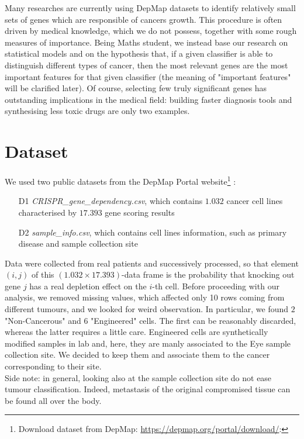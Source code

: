 \documentclass[a4paper,11pt, oneside]{article}  %
\begin{document}
	Many researches are currently using DepMap datasets to identify relatively small sets of genes which are responsible of cancers growth. This procedure is often driven by medical knowledge,  which we do not possess,  together with some rough measures of importance.  Being Maths student,  we instead base our research on statistical models and on the hypothesis that, if a given classifier is able to distinguish different types of cancer, then the most relevant genes are the most important features for that given classifier (the meaning of "important features" will be clarified later). Of course, selecting few truly significant genes has outstanding implications in the medical field: building faster diagnosis tools and synthesising less toxic drugs are only two examples. 
	
	
	\section{Dataset}
	We used two public datasets from the DepMap Portal website\footnote{Download dataset from DepMap:  \url{https://depmap.org/portal/download/}:} :
	\begin{itemize}
		\item[D1] \textit{CRISPR\_gene\_dependency.csv},  which contains $1.032$ cancer cell lines characterised by $17.393$ gene scoring results
		\item[D2] \textit{sample\_info.csv}, which contains cell lines information,  such as primary disease and sample collection site
	\end{itemize}
	Data were collected from real patients and successively processed,  so that element $(i, j)$ of this $(1.032 \times 17.393)$-data frame is the probability that knocking out gene $j$ has a real depletion effect on the $i$-th cell.
	Before proceeding with our analysis, we removed missing values, which affected only 10 rows coming from different tumours, and we looked for weird observation. In particular, we found $2$ "Non-Cancerous" and $6$ "Engineered" cells. The first can be reasonably discarded, whereas the latter requires a little care. Engineered cells are synthetically modified samples in lab and, here, they are manly associated to the Eye sample collection site. We decided to keep them and associate them to the cancer corresponding to their site. \\
	Side note: in general, looking also at the sample collection site do not ease tumour classification. Indeed, metastasis of the original compromised tissue can be found all over the body. \\
	
\end{document}
